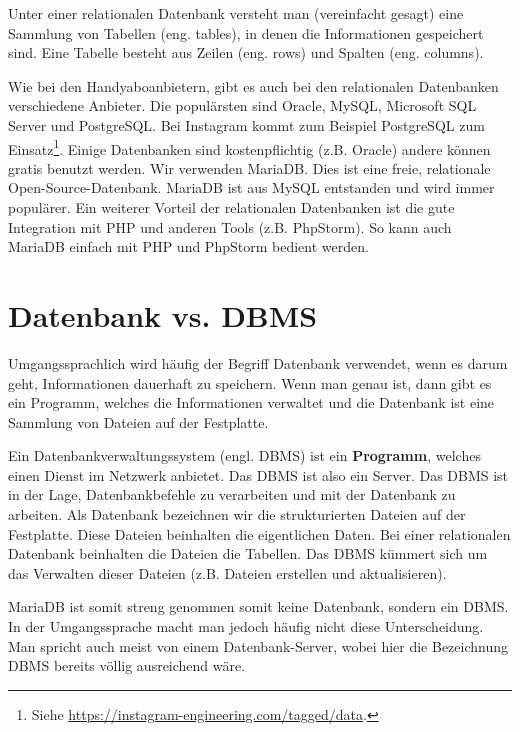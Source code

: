\begin{definition}
Unter einer relationalen Datenbank versteht man (vereinfacht gesagt) eine Sammlung von Tabellen (eng. tables), in denen die Informationen gespeichert sind. Eine Tabelle besteht aus Zeilen (eng. rows) und Spalten (eng. columns).
\end{definition}

Wie bei den Handyaboanbietern, gibt es auch bei den relationalen Datenbanken verschiedene Anbieter. Die populärsten sind Oracle, MySQL, Microsoft SQL Server und PostgreSQL. Bei Instagram kommt zum Beispiel PostgreSQL zum Einsatz\footnote{Siehe \url{https://instagram-engineering.com/tagged/data}.}. Einige Datenbanken sind kostenpflichtig (z.B. Oracle) andere können gratis benutzt werden. Wir verwenden MariaDB. Dies ist eine freie, relationale Open-Source-Datenbank. MariaDB ist aus MySQL entstanden und wird immer populärer. Ein weiterer Vorteil der relationalen Datenbanken ist die gute Integration mit \ac{PHP} und anderen Tools (z.B. PhpStorm). So kann auch MariaDB einfach mit \ac{PHP} und PhpStorm bedient werden.

\section{Datenbank vs. \acl{DBMS}}

Umgangssprachlich wird häufig der Begriff Datenbank verwendet, wenn es darum geht, Informationen dauerhaft zu speichern. Wenn man genau ist, dann gibt es ein Programm, welches die Informationen verwaltet und die Datenbank ist  eine Sammlung von Dateien auf der Festplatte.

\begin{definition}[Datenbankverwaltungssystem]
Ein Datenbankverwaltungssystem (engl. \acl{DBMS}) ist ein \textbf{Programm}, welches einen Dienst im Netzwerk anbietet. Das \ac{DBMS} ist also ein Server. Das \ac{DBMS} ist in der Lage, Datenbankbefehle zu verarbeiten und mit der Datenbank zu arbeiten. Als Datenbank bezeichnen wir die strukturierten Dateien auf der Festplatte. Diese Dateien beinhalten die eigentlichen Daten. Bei einer relationalen Datenbank beinhalten die Dateien die Tabellen. Das \ac{DBMS} kümmert sich um das Verwalten dieser Dateien (z.B. Dateien erstellen und aktualisieren).
\end{definition}

MariaDB ist somit streng genommen somit keine Datenbank, sondern ein \ac{DBMS}. In der Umgangssprache macht man jedoch häufig nicht diese Unterscheidung. Man spricht auch meist von einem Datenbank-Server, wobei hier die Bezeichnung \ac{DBMS} bereits völlig ausreichend wäre.

